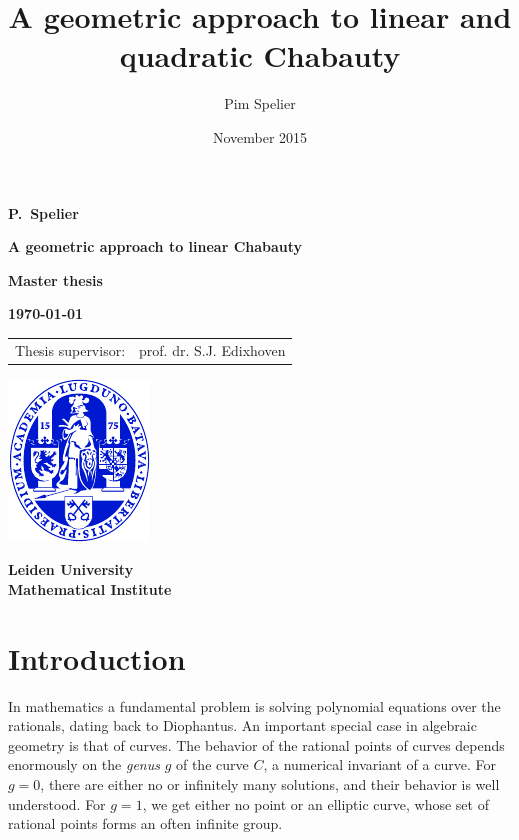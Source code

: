 \documentclass[12pt]{article}
\title{A geometric approach to linear and quadratic Chabauty}
\author{Pim Spelier}
\date{November 2015}
\theoremstyle{plain}
\theoremstyle{definition}
\theoremstyle{remark}
\begin{document}

\vspace*{1em}

\begin{center}

{\Large\bf 
P.\ Spelier
} 

\vspace{1em} 

{\LARGE\bf 
A geometric approach to linear Chabauty
} 

\vspace{10em} 

{\large\bf 
Master thesis
} 

\vspace{1em}

{\large\bf 
\today
}

\vspace{10em} 

{\large\bf
\begin{tabular}{ll}
Thesis supervisor: & prof. dr. S.J. Edixhoven\\
\end{tabular}
}

\vfill

\includegraphics{ulzegel_blauw}\\

\vspace{2em}

{\large\bf 
Leiden University\\
Mathematical Institute\\
}

\end{center}
\thispagestyle{empty}
\newpage
\listoftodos
\tableofcontents
\newpage

\section{Introduction}
\label{section:intro}
In mathematics a fundamental problem is solving polynomial equations over the rationals, dating back to Diophantus. An important special case in algebraic geometry is that of curves. The behavior of the rational points of curves depends enormously on the \textit{genus} $g$ of the curve $C$, a numerical invariant of a curve. For $g = 0$, there are either no or infinitely many solutions, and their behavior is well understood. For $g = 1$, we get either no point or an elliptic curve, whose set of rational points forms an often infinite group.
\end{document}
